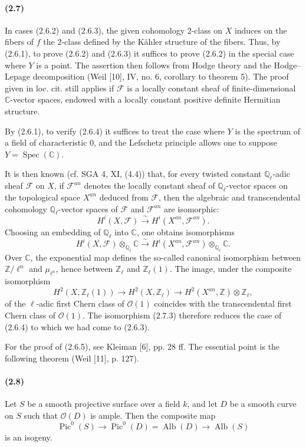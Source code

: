 \documentclass[10pt]{article}
\newcommand{\Z}{\mathbb Z}
\newcommand{\iso}{\xrightarrow{\sim}}
\providecommand{\C}{\mathbb C}
\providecommand{\Ql}{\mathbb Q_\ell}
\providecommand{\Zl}{\mathbb Z_\ell}
\providecommand{\Alb}{\operatorname{Alb}}
\providecommand{\Pic}{\operatorname{Pic}}
\providecommand{\Spec}{\operatorname{Spec}}
\begin{document}
\paragraph{(2.7)} In cases (2.6.2) and (2.6.3), the given cohomology $2$-class on $X$ induces on the fibers of $f$ the $2$-class defined by the Kähler structure of the fibers. Thus, by (2.6.1), to prove (2.6.2) and (2.6.3) it suffices to prove (2.6.2) in the special case where $Y$ is a point. The assertion then follows from Hodge theory and the Hodge--Lepage decomposition (Weil [10], IV, no. 6, corollary to theorem 5). The proof given in loc. cit. still applies if $\mathcal F$ is a locally constant sheaf of finite-dimensional $\C$-vector spaces, endowed with a locally constant positive definite Hermitian structure.

By (2.6.1), to verify (2.6.4) it suffices to treat the case where $Y$ is the spectrum of a field of characteristic $0$, and the Lefschetz principle allows one to suppose $Y=\Spec(\C)$.

It is then known (cf. SGA 4, XI, (4.4)) that, for every twisted constant $\Ql$-adic sheaf $\mathcal F$ on $X$, if $\mathcal F^{an}$ denotes the locally constant sheaf of $\Ql$-vector spaces on the topological space $X^{an}$ deduced from $\mathcal F$, then the algebraic and transcendental cohomology $\Ql$-vector spaces of $\mathcal F$ and $\mathcal F^{an}$ are isomorphic:
\[
\tag{2.7.2}
H^i(X,\mathcal F)\iso H^i(X^{an},\mathcal F^{an}).
\]
Choosing an embedding of $\Ql$ into $\C$, one obtains isomorphisms
\[
\tag{2.7.3}
H^i(X,\mathcal F)\otimes_{\Ql}\C\iso
H^i(X^{an},\mathcal F^{an})\otimes_{\Ql}\C.
\]
Over $\C$, the exponential map defines the so-called canonical isomorphism between $\Z/\ell^n$ and $\mu_{\ell^n}$, hence between $\Zl$ and $\Zl(1)$. The image, under the composite isomorphism
\[
H^2(X,\Zl(1))\longrightarrow H^2(X,\Zl)\longrightarrow H^2(X^{an},\Z)\otimes\Zl,
\]
of the $\ell$-adic first Chern class of $\mathcal O(1)$ coincides with the transcendental first Chern class of $\mathcal O(1)$. The isomorphism (2.7.3) therefore reduces the case of (2.6.4) to which we had come to (2.6.3).

For the proof of (2.6.5), see Kleiman [6], pp. 28 ff. The essential point is the following theorem (Weil [11], p. 127).

\paragraph{(2.8)} Let $S$ be a smooth projective surface over a field $k$, and let $D$ be a smooth curve on $S$ such that $\mathcal O(D)$ is ample. Then the composite map
\[
\Pic^0(S)\longrightarrow\Pic^0(D)=\Alb(D)\longrightarrow\Alb(S)
\]
is an isogeny.
\end{document}
